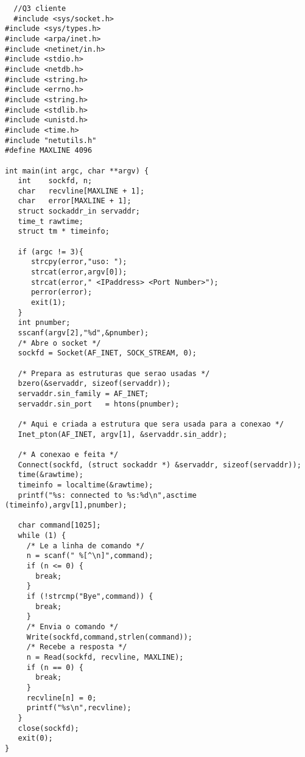 \documentclass[11pt]{article}
\begin{document}
\begin{lstlisting}
  //Q3 cliente
  #include <sys/socket.h>
#include <sys/types.h>
#include <arpa/inet.h>
#include <netinet/in.h>
#include <stdio.h>
#include <netdb.h>
#include <string.h>
#include <errno.h>
#include <string.h>
#include <stdlib.h>
#include <unistd.h>
#include <time.h>
#include "netutils.h"
#define MAXLINE 4096

int main(int argc, char **argv) {
   int    sockfd, n;
   char   recvline[MAXLINE + 1];
   char   error[MAXLINE + 1];
   struct sockaddr_in servaddr;
   time_t rawtime;
   struct tm * timeinfo;

   if (argc != 3){
      strcpy(error,"uso: ");
      strcat(error,argv[0]);
      strcat(error," <IPaddress> <Port Number>");
      perror(error);
      exit(1);
   }
   int pnumber;
   sscanf(argv[2],"%d",&pnumber);
   /* Abre o socket */
   sockfd = Socket(AF_INET, SOCK_STREAM, 0);

   /* Prepara as estruturas que serao usadas */
   bzero(&servaddr, sizeof(servaddr));
   servaddr.sin_family = AF_INET;
   servaddr.sin_port   = htons(pnumber);

   /* Aqui e criada a estrutura que sera usada para a conexao */
   Inet_pton(AF_INET, argv[1], &servaddr.sin_addr);

   /* A conexao e feita */
   Connect(sockfd, (struct sockaddr *) &servaddr, sizeof(servaddr));
   time(&rawtime);
   timeinfo = localtime(&rawtime);
   printf("%s: connected to %s:%d\n",asctime (timeinfo),argv[1],pnumber);

   char command[1025];
   while (1) {
     /* Le a linha de comando */
     n = scanf(" %[^\n]",command);
     if (n <= 0) {
       break;
     }
     if (!strcmp("Bye",command)) {
       break;
     }
     /* Envia o comando */
     Write(sockfd,command,strlen(command));
     /* Recebe a resposta */
     n = Read(sockfd, recvline, MAXLINE);
     if (n == 0) {
       break;
     }
     recvline[n] = 0;
     printf("%s\n",recvline);
   }
   close(sockfd);
   exit(0);
}

\end{lstlisting}
\end{document}
